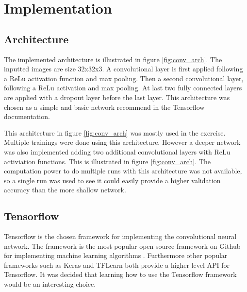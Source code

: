 \chapter{Implementation}
\label{chp:imp}

\section{Architecture}
The implemented architecture is illustrated in figure \ref{fig:conv_arch}. The inputted images are size 32x32x3. A convolutional layer is first applied following a ReLu activation function and max pooling. Then a second convolutional layer, following a ReLu activation and max pooling. At last two fully connected layers are applied with a dropout layer before the last layer. This architecture was chosen as a simple and basic network recommend in the Tensorflow documentation.


This architecture in figure \ref{fig:conv_arch} was mostly used in the exercise. Multiple trainings were done using this architecture. However a deeper network was also implemented adding two additional convolutional layers with ReLu activiation functions. This is illustrated in figure \ref{fig:conv_arch}. The computation power to do multiple runs with this architecture was not available, so a single run was used to see it could easily provide a higher validation accuracy than the more shallow network.




\section{Tensorflow}
Tensorflow is the chosen framework for implementing the convolutional neural network. The framework is the most popular open source framework on Github for implementing machine learning algorithms \citep{ML_frameworks}. Furthermore other popular frameworks such as Keras and TFLearn both provide a higher-level API for Tensorflow. It was decided that learning how to use the Tensorflow framework would be an interesting choice.

